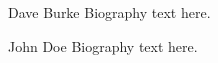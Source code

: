 \documentclass[journal]{IEEEtran}
\begin{document}
\begin{IEEEbiography}{Dave Burke}
Biography text here.
\end{IEEEbiography}

\begin{IEEEbiographynophoto}{John Doe}
Biography text here.
\end{IEEEbiographynophoto}




\end{document}
